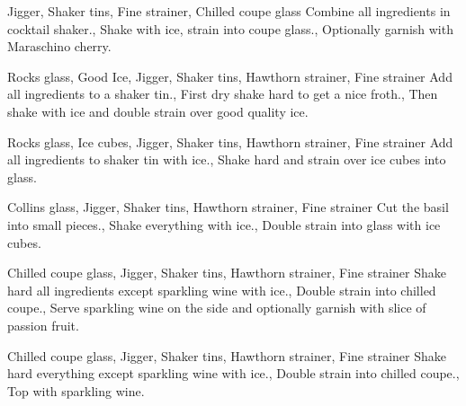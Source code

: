 \documentclass[../main.tex]{subfiles}
\begin{document}
\clearpage
{}

{Jigger, Shaker tins, Fine strainer, Chilled coupe glass}
{
    Combine all ingredients in cocktail shaker.,
    {Shake with ice, strain into coupe glass.},
    Optionally garnish with Maraschino cherry.
}

\cocktailDivider

{Rocks glass, Good Ice, Jigger, Shaker tins, Hawthorn strainer, Fine strainer}
{
    {Add all ingredients to a shaker tin.},
    {First dry shake hard to get a nice froth.},
    {Then shake with ice and double strain over good quality ice.}
}

\cocktailDivider

{Rocks glass, Ice cubes, Jigger, Shaker tins, Hawthorn strainer, Fine strainer}
{
    {Add all ingredients to shaker tin with ice.},
    {Shake hard and strain over ice cubes into glass.}
}

\cocktailDivider

{Collins glass, Jigger, Shaker tins, Hawthorn strainer, Fine strainer}
{
    {Cut the basil into small pieces.},
    {Shake everything with ice.},
    {Double strain into glass with ice cubes.}
}

\pagebreak

{Chilled coupe glass, Jigger, Shaker tins, Hawthorn strainer, Fine strainer}
{
    {Shake hard all ingredients except sparkling wine with ice.},
    {Double strain into chilled coupe.},
    {Serve sparkling wine on the side and optionally garnish with slice of passion fruit.}
}

\cocktailDivider

{Chilled coupe glass, Jigger, Shaker tins, Hawthorn strainer, Fine strainer}
{
    {Shake hard everything except sparkling wine with ice.},
    {Double strain into chilled coupe.},
    {Top with sparkling wine.}
}
\end{document}
